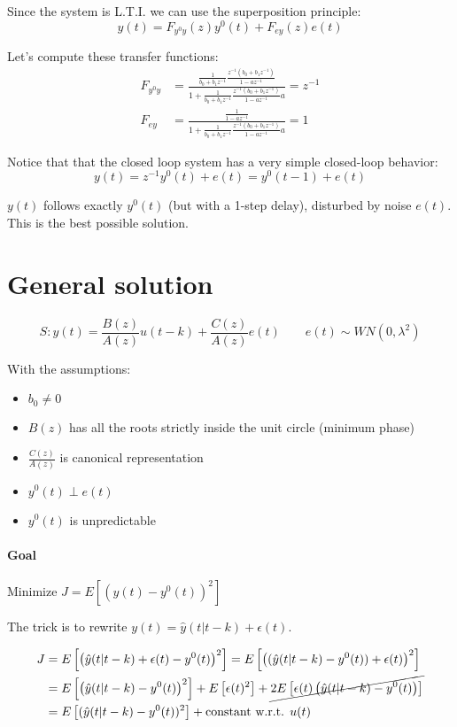Since the system is L.T.I. we can use the superposition principle:
\[
    y(t) = F_{y^0y}(z)y^0(t) + F_{ey}(z)e(t)
\]

Let's compute these transfer functions:
\begin{align*}
    F_{y^0y} &= \frac{ \frac{1}{b_0+b_1z^{-1}} \frac{z^{-1}(b_0+b_1z^{-1})}{1-az^{-1}} }{ 1 + \frac{1}{b_0+b_1z^{-1}} \frac{z^{-1}(b_0+b_1z^{-1})}{1-az^{-1}}a } = z^{-1} \\
    F_{ey} &= \frac{ \frac{1}{1-az^{-1}} }{ 1 + \frac{1}{b_0+b_1z^{-1}} \frac{z^{-1}(b_0+b_1z^{-1})}{1-az^{-1}}a } = 1
\end{align*}

Notice that that the closed loop system has a very simple closed-loop behavior:
\[
    y(t) = z^{-1}y^0(t) + e(t) = y^0(t-1) + e(t)
\]

$y(t)$ follows exactly $y^0(t)$ (but with a 1-step delay), disturbed by noise $e(t)$.
This is the best possible solution.

\section{General solution}

\[
    S: y(t) = \frac{B(z)}{A(z)}u(t-k) + \frac{C(z)}{A(z)}e(t) \qquad e(t) \sim WN(0, \lambda^2)
\]

With the assumptions:
\begin{itemize}
    \item $b_0 \ne 0$
    \item $B(z)$ has all the roots strictly inside the unit circle (minimum phase)
    \item $\frac{C(z)}{A(z)}$ is canonical representation
    \item $y^0(t) \perp e(t)$
    \item $y^0(t)$ is unpredictable
\end{itemize}

\paragraph{Goal} Minimize $J = E\left[ \left( y(t) - y^0(t) \right)^2 \right]$

The trick is to rewrite $y(t) = \hat{y}(t|t-k) + \epsilon(t)$.

\begin{align*}
    J &= E\left[ \left( \hat{y}(t|t-k) + \epsilon(t) - y^0(t) \right)^2 \right] = E\left[ \left( (\hat{y}(t|t-k) - y^0(t)) + \epsilon(t) \right)^2 \right] \\
    & = E\left[ \left(\hat{y}(t|t-k) - y^0(t)\right)^2 \right] + E\left[ \epsilon(t)^2 \right] + \cancel{2E\left[ \epsilon(t)\left( \hat{y}(t|t-k) - y^0(t) \right) \right]} \\
    &= E\left[ (\hat{y}(t|t-k) - y^0(t))^2 \right] + \text{constant w.r.t. $u(t)$}
\end{align*}

